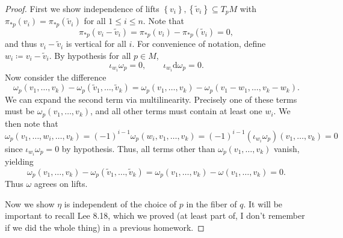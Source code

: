 \documentclass[10pt, letterpaper]{article}
\begin{document}
\begin{proof}
	First we show independence of lifts $\left\{ v_i \right\},\left\{ \widetilde{v} _i \right\} \subseteq T_pM$ with $\pi _{*p} (v_i)=\pi _{*p} (\widetilde{v} _i)$ for all $1\leq i\leq n$. Note that
	\[
		\pi _{*p} (v_i- \widetilde{v} _i) = \pi _{*p} (v_i)-\pi _{*p} (\widetilde{v} _i)=0,
	\]
	and thus $v_i - \widetilde{v} _i$ is vertical for all $i$. For convenience of notation, define $w_i \coloneqq v_i - \widetilde{v} _i$. By hypothesis for all $p\in M$,
	\[
		\iota_{w_i} \omega _p=0,\qquad \iota _{w_i} \mathrm{d} \omega _p = 0
	.\]
	Now consider the difference
	\[
		\omega _p(v_1, \ldots ,v_k) - \omega _p( \widetilde{v} _1, \ldots , \widetilde{v} _k) = \omega _p(v_1, \ldots ,v_k) - \omega _p( v_1 - w_1, \ldots ,v_k-w_k)
	.\]
	We can expand the second term via multilinearity. Precisely one of these terms must be $\omega _p(v_1, \ldots ,v_k)$, and all other terms must contain at least one $w_i$. We then note that
	\[
		\omega _p(v_1, \ldots , w_i ,\ldots ,v_k) = (-1)^{i-1} \omega _p(w_i, v_1, \ldots ,v_k)=(-1)^{i-1} (\iota _{w_i} \omega _p)(v_1, \ldots ,v_k)=0
	\]
	since $\iota _{w_i} \omega _p=0$ by hypothesis. Thus, all terms other than $\omega _p(v_1, \ldots ,v_k)$ vanish, yielding
	\[
		\omega _p(v_1, \ldots ,v_k) - \omega _p( \widetilde{v} _1, \ldots , \widetilde{v} _k) = \omega _p(v_1, \ldots ,v_k) - \omega (v_1, \ldots ,v_k)=0
	.\]
	Thus $\omega $ agrees on lifts.

	Now we show $\eta $ is independent of the choice of $p$ in the fiber of $q$. It will be important to recall Lee 8.18, which we proved (at least part of, I don't remember if we did the whole thing) in a previous homework.


\end{proof}
\end{document}
